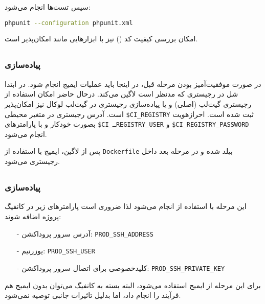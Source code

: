 سپس تست‌ها انجام می‌شود:
\begin{latin}
\begin{lstlisting}[language=Bash]
phpunit --configuration phpunit.xml
\end{lstlisting}
\end{latin}

امکان بررسی کیفیت کد 
()
نیز با ابزارهایی مانند
امکان‌پذیر است.

\subsection{ }
\subsubsection{پیاده‌سازی }
در صورت موفقیت‌آمیز بودن مرحله قبل، در اینجا باید
عملیات
ایمیج انجام شود.
در ابتدا 
شل در رجیستری که مدنظر است لاگین می‌کند. درحال حاضر امکان استفاده از رجیستری گیت‌لب (اصلی) و یا پیاده‌سازی رجیستری در گیت‌لب لوکال نیز امکان‌پذیر است.
آدرس رجیستری در متغیر محیطی
\texttt{\$CI\_REGISTRY}
ثبت شده است.
احرازهویت بصورت خودکار و با پارامترهای
\texttt{\$CI\_ـREGISTRY\_USER}
و
\texttt{\$CI\_REGISTRY\_PASSWORD}
انجام می‌شود.

پس از لاگین، ایمیج
با استفاده از 
\texttt{Dockerfile}
بیلد شده و در مرحله بعد داخل رجیستری 
می‌شود.

\subsection{ }
\subsubsection{پیاده‌سازی }
این مرحله با استفاده از 
انجام می‌شود لذا ضروری است پارامترهای
زیر در کانفیگ پروژه اضافه شوند:

\begin{itemize}
\item[-]
آدرس سرور پروداکشن:
\texttt{PROD\_SSH\_ADDRESS}
\item[-]
یوزرنیم:
\texttt{PROD\_SSH\_USER}
\item[-]
کلیدخصوصی برای اتصال سرور پروداکشن:
\texttt{PROD\_SSH\_PRIVATE\_KEY}
\end{itemize}

برای این مرحله از ایمیج
استفاده می‌شود، البته بسته به کانفیگ 
می‌توان
بدون ایمیج هم فرآیند را انجام داد، اما بدلیل تاثیرات جانبی توصیه نمی‌شود.

